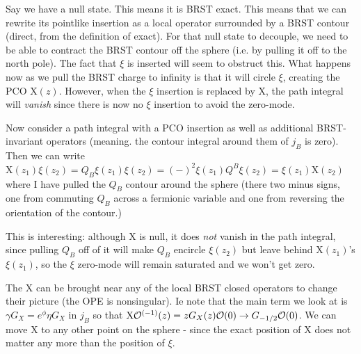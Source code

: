 \documentclass[11pt, class=article, crop=false]{standalone}
\begin{document}
\begin{enumerate}
	Say we have a null state. This means it is BRST exact. This means that we can rewrite its pointlike insertion as a local operator surrounded by a BRST contour (direct, from the definition of exact).
	For that null state to decouple, we need to be able to contract the BRST contour off the sphere (i.e. by pulling it off to the north pole). The fact that $\xi$ is inserted will seem to obstruct this. What happens now as we pull the BRST charge to infinity is that it will circle $\xi$, creating the PCO $\mathrm X(z)$. However, when the $\xi$ insertion is replaced by $\mathrm X$, the path integral will \emph{vanish} since there is now no $\xi$ insertion to avoid the zero-mode.
	
	Now consider a path integral with a PCO insertion as well as additional BRST-invariant operators (meaning. the contour integral around them of $j_B$ is zero). Then we can write $\mathrm X(z_1) \xi(z_2) = Q_B \xi(z_1) \xi(z_2) = (-)^2 \xi(z_1) Q^B \xi(z_2) = \xi(z_1) \mathrm X(z_2) $ where I have pulled the $Q_B$ contour around the sphere (there two minus signs, one from commuting $Q_B$ across a fermionic variable and one from reversing the orientation of the contour.) 
	
	This is interesting: although $\mathrm X$ is null, it does \emph{not} vanish in the path integral, since pulling $Q_B$ off of it will make $Q_B$ encircle $\xi(z_2)$ but leave behind $\mathrm X(z_1)$'s $\xi(z_1)$, so the $\xi$ zero-mode will remain saturated and we won't get zero. 
	
	The $\mathrm X$ can be brought near any of the local BRST closed operators to change their picture (the OPE is nonsingular). Ie note that the main term we look at is $\gamma G_X = e^{\phi} \eta G_X$ in $j_B$ so that $\mathrm X \mathcal{O}^{(-1)}(z) = z G_X(z) \mathcal{O}(0) \to G_{-1/2} \mathcal{O}(0)$. We can move $\mathrm X$ to any other point on the sphere - since the exact position of $\mathrm X$ does not matter any more than the position of $\xi$.
	

\end{enumerate}
\end{document}
